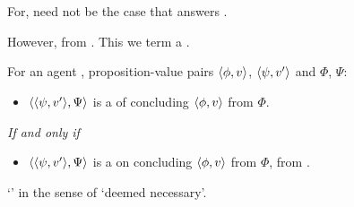 \section{}
\label{cha:zS:sec:requs}

\begin{note}
  For, need not be the case that \ros{} answers \qWhy{}.

  However, \curb{} from \agpe{}.
  This we term a \requ{}.

  \begin{definition}[\requ{2}]
    \label{def:requ}
    For an agent \vAgent{}, proposition-value pairs \(\langle \phi, v \rangle\), \(\langle \psi, v' \rangle\) and  \(\Phi\), \(\Psi\):

    \begin{itemize}
    \item
      \(\langle \langle \psi, v' \rangle, \Psi \rangle\) is a \requ{} of concluding \(\langle \phi, v \rangle\) from \(\Phi\).
    \end{itemize}

    \emph{If and only if}

    \begin{itemize}
    \item
      \(\langle \langle \psi, v' \rangle, \Psi \rangle\) is a \curb{} on concluding \(\langle \phi, v \rangle\) from \(\Phi\), from .
    \end{itemize}
    \vspace{-\baselineskip}
  \end{definition}

  `' in the sense of `deemed necessary'.
\end{note}

